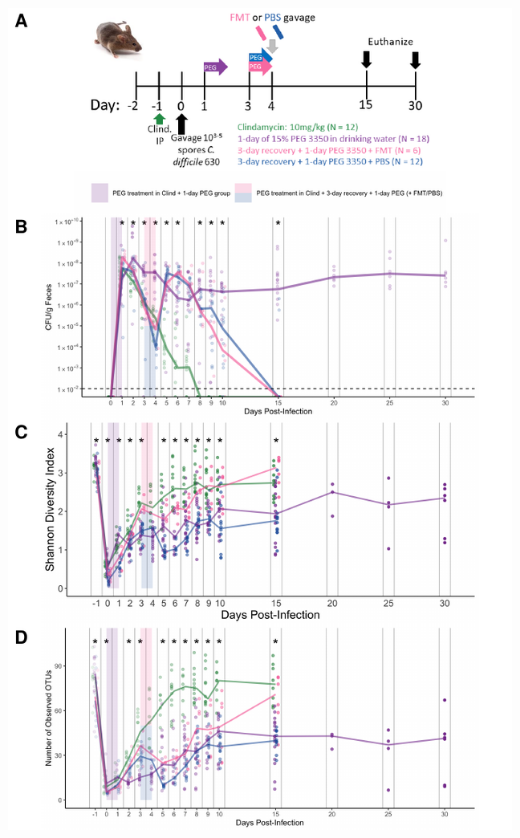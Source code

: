 \documentclass[
  11pt,
]{article}
\begin{document}
\includegraphics{figure_5.pdf} \newpage
\end{document}
